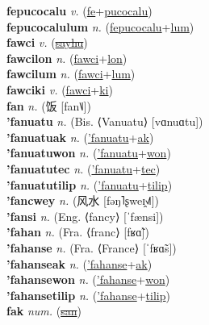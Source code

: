 \textbf{fepucocalu} \textit{v.} (\hyperref[fe]{fe}+\hyperref[pucocalu]{pucocalu})
 \label{fepucocalu} \\
\textbf{fepucocalulum} \textit{n.} (\hyperref[fepucocalu]{fepucocalu}+\hyperref[lum]{lum})
 \label{fepucocalulum} \\
\textbf{fawci} \textit{v.} (\hyperref[sayhu]{\sout{sayhu}})
 \label{fawci} \\
\textbf{fawcilon} \textit{n.} (\hyperref[fawci]{fawci}+\hyperref[lon]{lon})
 \label{fawcilon} \\
\textbf{fawcilum} \textit{n.} (\hyperref[fawci]{fawci}+\hyperref[lum]{lum})
 \label{fawcilum} \\
\textbf{fawciki} \textit{v.} (\hyperref[fawci]{fawci}+\hyperref[ki]{ki})
 \label{fawciki} \\
\textbf{fan} \textit{n.} ({\chinese{}饭} [fan˥˩])
 \label{fan} \\
\textbf{'fanuatu} \textit{n.} (Bis. ⟨Vanuatu⟩ [vɑnuɑtu])
 \label{'fanuatu} \\
\textbf{'fanuatuak} \textit{n.} (\hyperref['fanuatu]{'fanuatu}+\hyperref[ak]{ak})
 \label{'fanuatuak} \\
\textbf{'fanuatuwon} \textit{n.} (\hyperref['fanuatu]{'fanuatu}+\hyperref[won]{won})
 \label{'fanuatuwon} \\
\textbf{'fanuatutec} \textit{n.} (\hyperref['fanuatu]{'fanuatu}+\hyperref[tec]{tec})
 \label{'fanuatutec} \\
\textbf{'fanuatutilip} \textit{n.} (\hyperref['fanuatu]{'fanuatu}+\hyperref[tilip]{tilip})
 \label{'fanuatutilip} \\
\textbf{'fancwey} \textit{n.} ({\chinese{}风水} [fəŋ˥ʂweɪ̯˧˩˥])
 \label{'fancwey} \\
\textbf{'fansi} \textit{n.} (Eng. ⟨fancy⟩ [ˈfænsi])
 \label{'fansi} \\
\textbf{'fahan} \textit{n.} (Fra. ⟨franc⟩ [fʁɑ̃])
 \label{'fahan} \\
\textbf{'fahanse} \textit{n.} (Fra. ⟨France⟩ [ˈfʁɑ̃s])
 \label{'fahanse} \\
\textbf{'fahanseak} \textit{n.} (\hyperref['fahanse]{'fahanse}+\hyperref[ak]{ak})
 \label{'fahanseak} \\
\textbf{'fahansewon} \textit{n.} (\hyperref['fahanse]{'fahanse}+\hyperref[won]{won})
 \label{'fahansewon} \\
\textbf{'fahansetilip} \textit{n.} (\hyperref['fahanse]{'fahanse}+\hyperref[tilip]{tilip})
 \label{'fahansetilip} \\
\textbf{fak} \textit{num.} (\hyperref[san]{\sout{san}})
